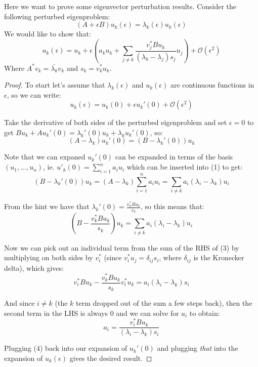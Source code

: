 \documentclass[10pt,a4paper]{article}
\newenvironment{problem}[2][Problem]{\begin{trivlist}
\item[\hskip \labelsep {\bfseries #1}\hskip \labelsep {\bfseries #2.}]}{\end{trivlist}}
\begin{document}
\begin{problem}{2}
Here we want to prove some eigenvector perturbation results.  Consider the following perturbed eigenproblem:
\[
(A + \epsilon B) u_k(\epsilon) = \lambda_k(\epsilon) u_k(\epsilon)
\]
We would like to show that:
\[
u_k(\epsilon) = u_k + \epsilon(a_k u_k + \sum\limits_{j \neq k} \frac{v_j^* B u_k}{(\lambda_k - \lambda_j) s_j}u_j) + \mathcal{O}(\epsilon^2)
\]
Where $A^* v_k = \bar{\lambda_k} v_k$ and $s_k = v_k^* u_k$.
\end{problem}
\begin{proof}
To start let's assume that $\lambda_k(\epsilon)$ and $u_k(\epsilon)$ are continuous functions in $\epsilon$, so we can write:
\[
u_k(\epsilon) = u_k(0) + \epsilon u_k'(0) + \mathcal{O}(\epsilon^2)
\]

Take the derivative of both sides of the perturbed eigenproblem and set $\epsilon=0$ to get $B u_k + A u_k'(0) = \lambda_k'(0) u_k + \lambda_k u_k'(0)$, so:
\begin{equation}
(A- \lambda_k) u_k'(0) = (B - \lambda_k'(0)) u_k
\end{equation}

Note that we can expaned $u_k'(0)$ can be expanded in terms of the basis $(u_1,...,u_n)$, ie. $u'_k(0) = \sum\limits_{i=1}^n a_i u_i$ which can be inserted into (1) to get:
\begin{equation}
(B - \lambda_k'(0)) u_k = (A - \lambda_k) \sum\limits_{i=1}^n a_i u_i = \sum\limits_{i \neq k} a_i (\lambda_i - \lambda_k) u_i
\end{equation}

From the hint we have that $\lambda_k'(0) = \frac{v_k^* B u_k}{s_k}$, so this means that:
\begin{equation}
(B -  \frac{v_k^* B u_k}{s_k}) u_k = \sum\limits_{i \neq k} a_i (\lambda_i - \lambda_k) u_i
\end{equation}

Now we can pick out an individual term from the sum of the RHS of (3) by multiplying on both sides by $v_i^*$ (since $v_i^* u_j = \delta_{ij} s_i$, where $\delta_{ij}$ is the Kronecker delta), which gives:
\[
v_i^*Bu_k - \frac{v_k^* B u_k}{s_k} v_i^*u_k = a_i (\lambda_i - \lambda_k) s_i
\]

And since $i \neq k$ (the $k$ term dropped out of the sum a few steps back), then the second term in the LHS is always 0 and we can solve for $a_i$ to obtain:
\begin{equation}
a_i = \frac{v_i^* B u_k}{(\lambda_i - \lambda_k) s_i}
\end{equation}

Plugging (4) back into our expansion of $u_k'(0)$ and plugging \textit{that} into the expansion of $u_k(\epsilon)$ gives the desired result.
\end{proof}
\end{document}
